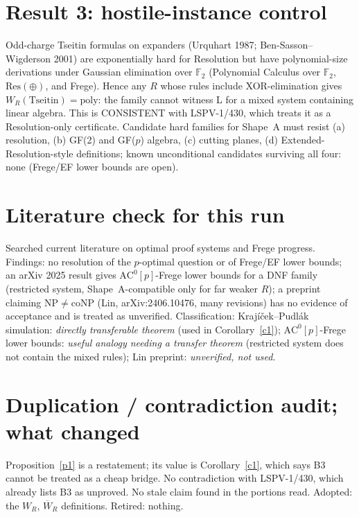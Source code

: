 \documentclass{article}
\begin{document}
\section*{Result 3: hostile-instance control}
Odd-charge Tseitin formulas on expanders (Urquhart 1987; Ben-Sasson--Wigderson 2001) are exponentially hard for Resolution but have polynomial-size derivations under Gaussian elimination over $\mathbb F_2$ (Polynomial Calculus over $\mathbb F_2$, $\mathrm{Res}(\oplus)$, and Frege). Hence any $R$ whose rules include XOR-elimination gives $W_R(\mathrm{Tseitin})=\mathrm{poly}$: the family cannot witness L for a mixed system containing linear algebra. This is CONSISTENT with LSPV-1/430, which treats it as a Resolution-only certificate. Candidate hard families for Shape~A must resist (a) resolution, (b) GF(2) and GF($p$) algebra, (c) cutting planes, (d) Extended-Resolution-style definitions; known unconditional candidates surviving all four: none (Frege/EF lower bounds are open).

\section*{Literature check for this run}
Searched current literature on optimal proof systems and Frege progress. Findings: no resolution of the $p$-optimal question or of Frege/EF lower bounds; an arXiv 2025 result gives $\mathrm{AC}^0[p]$-Frege lower bounds for a DNF family (restricted system, Shape~A-compatible only for far weaker $R$); a preprint claiming NP${}\ne{}$coNP (Lin, arXiv:2406.10476, many revisions) has no evidence of acceptance and is treated as unverified. Classification: Krajíček--Pudl\'ak simulation: \emph{directly transferable theorem} (used in Corollary~\ref{c1}); $\mathrm{AC}^0[p]$-Frege lower bounds: \emph{useful analogy needing a transfer theorem} (restricted system does not contain the mixed rules); Lin preprint: \emph{unverified, not used}.

\section*{Duplication / contradiction audit; what changed}
Proposition~\ref{p1} is a restatement; its value is Corollary~\ref{c1}, which says B3 cannot be treated as a cheap bridge. No contradiction with LSPV-1/430, which already lists B3 as unproved. No stale claim found in the portions read. Adopted: the $W_R$, $\overline W_R$ definitions. Retired: nothing.
\end{document}

